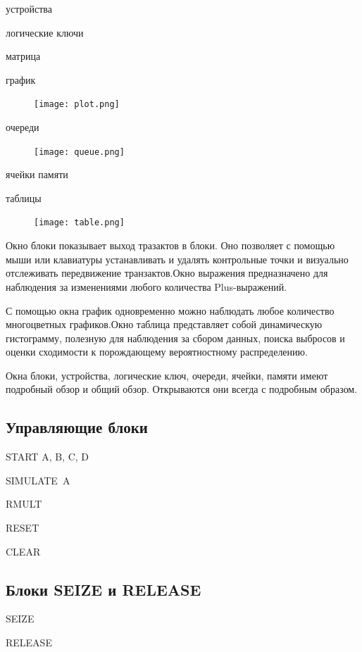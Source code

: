 \documentclass[14pt]{extarticle}
\begin{document}
устройства

логические ключи

матрица

\newpage

график


\begin{figure}[h!]
    \centering
    \texttt{[image: plot.png]}
\end{figure}

очереди

\begin{figure}[h!]
    \centering
    \texttt{[image: queue.png]}
\end{figure}

ячейки памяти

таблицы

\begin{figure}[h!]
    \centering
    \texttt{[image: table.png]}
\end{figure}

Окно блоки показывает выход тразактов в блоки. Оно позволяет с помощью мыши или клавиатуры устанавливать и удалять контрольные точки и визуально отслеживать передвижение транзактов.Окно выражения предназначено для наблюдения за изменениями любого количества Plus-выражений.

С помощью окна график одновременно можно наблюдать любое количество многоцветных графиков.Окно таблица представляет собой динамическую гистограмму, полезную для наблюдения за сбором данных, поиска выбросов и оценки сходимости к порождающему вероятностному распределению.

Окна блоки, устройства, логические ключ, очереди, ячейки, памяти имеют подробный обзор и общий обзор. Открываются они всегда с подробным образом.


\subsection*{Управляющие блоки}

START A, B, C, D

SIMULATE A 

RMULT

RESET

CLEAR

\subsection*{Блоки SEIZE и RELEASE}

SEIZE

RELEASE
\end{document}
